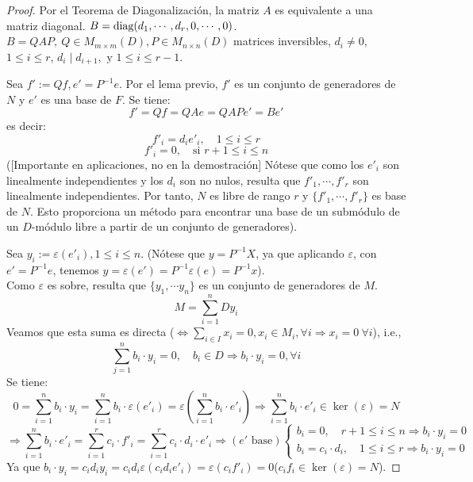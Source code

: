 \documentclass{article}
\theoremstyle{theorem-style}  %
\theoremstyle{definition}
\theoremstyle{example-style}
\begin{document}
\begin{proof}
		Por el Teorema de Diagonalización, la matriz $ A $ es equivalente a una matriz diagonal. $ B= \text{diag}(d_1, \cdots,\\ d_r, 0, \cdots, 0)$. 
		$ B= QAP,\  Q\in M_{m\times m} (D), P\in M_{n\times n} (D) $ matrices inversibles, $ d_i\neq 0 $, $ 1 \leq i \leq r$, $d_i \mid d_{i+1}, \text{ y } 1 \leq i \leq r-1 $.
		
		Sea $ f':=Qf, e'=P^{-1}e $.
		Por el lema previo, $ f' $ es un conjunto de generadores de $ N $ y $ e' $ es una base de $ F $.
		Se tiene:
		\[ f'=Qf=QAe=QAPe'=Be' \]
		es decir:
		\[ f'_i=d_ie'_i, \quad 1 \leq i \leq r \]
		\[ f'_i =0,  \quad \text{si } r+1 \leq i \leq n\]
		([Importante en aplicaciones, no en la demostración] Nótese que como los $ e'_i $ son linealmente independientes y los $ d_i $ son no nulos, resulta que $ f'_1, \cdots, f'_r $ son linealmente independientes. Por tanto, $ N $ es libre de rango $ r $ y $ \{ f'_1, \cdots, f'_r\} $ es base de $ N $. Esto proporciona un método para encontrar una base de un submódulo de un $ D $-módulo libre a partir de un conjunto de generadores).
		
		Sea $y_i := \varepsilon(e'_i), 1 \leq i \leq n$. (Nótese que $ y=P^{-1}X $, ya que aplicando $\varepsilon $, con $ e'=P^{-1}e $, tenemos $ y=\varepsilon(e')=P^{-1}\varepsilon(e)=P^{-1}x $).\\
		Como $ \varepsilon $ es sobre, resulta que $ \{y_1, \cdots y_n \} $ es un conjunto de generadores de $ M $. 
		\[ M=\sum_{i=1}^{n}Dy_i\]
		Veamos que esta suma es directa ($ \Leftrightarrow \sum_{i\in I} x_i=0, x_i\in M_i, \forall i \Rightarrow x_i=0\ \forall i $), i.e.,
		\[ \sum_{j=1}^{n} b_i\cdot y_i=0, \quad b_i \in D \Rightarrow b_i\cdot y_i=0, \forall i \]
		Se tiene: 
		\[ 0=\sum_{i=1}^{n} b_i \cdot y_i = \sum_{i=1}^{n} b_i \cdot \varepsilon(e'_i)=\varepsilon (\sum_{i=1}^{n} b_i \cdot e'_i)\Rightarrow \sum_{i=1}^{n} b_i \cdot e'_i \in \ker(\varepsilon)=N \]
		\[ \Rightarrow \sum_{i=1}^{n} b_i \cdot e'_i=\sum_{i=1}^{r} c_i \cdot f'_i= \sum_{i=1}^{r} c_i \cdot d_i \cdot e'_i \Rightarrow (e'\text{ base}) \begin{cases}
		b_i=0, \quad r+1 \leq i \leq n \Rightarrow b_i \cdot y_i =0\\
		b_i=c_i\cdot d_i, \quad 1 \leq i \leq r \Rightarrow b_i\cdot y_i=0
		\end{cases}\]
		Ya que $ b_i\cdot y_i=c_id_iy_i=c_id_i\varepsilon(c_id_ie'_i)=\varepsilon(c_if'_i)=0 $($c_if_i\in \ker(\varepsilon)=N$).
		

\end{proof}
\end{document}
